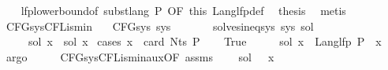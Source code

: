 \begin{isabellebody}
\ \ \isamarkupfalse%
\ lfp{\isacharunderscore}{\kern0pt}lowerbound{\isacharbrackleft}{\kern0pt}of\ {\isachardoublequoteopen}subst{\isacharunderscore}{\kern0pt}lang\ P{\isachardoublequoteclose}{\isacharcomma}{\kern0pt}\ OF\ this{\isacharbrackright}{\kern0pt}\ Lang{\isacharunderscore}{\kern0pt}lfp{\isacharunderscore}{\kern0pt}def\ \isamarkupfalse%
\ {\isacharquery}{\kern0pt}thesis\ \isamarkupfalse%
\ metis\isanewline
{}\isamarkupfalse%
%
\endisatagproof
{\isafoldproof}%
%
\isadelimproof
\isanewline
%
\endisadelimproof
\isanewline
{}\isamarkupfalse%
\ CFG{\isacharunderscore}{\kern0pt}sys{\isacharunderscore}{\kern0pt}CFL{\isacharunderscore}{\kern0pt}is{\isacharunderscore}{\kern0pt}min{\isacharcolon}{\kern0pt}\isanewline
\ \ \ {\isachardoublequoteopen}CFG{\isacharunderscore}{\kern0pt}sys\ sys{\isachardoublequoteclose}\isanewline
\ \ \ \ \ \ \ {\isachardoublequoteopen}solves{\isacharunderscore}{\kern0pt}ineq{\isacharunderscore}{\kern0pt}sys\ sys\ sol{\isacharprime}{\kern0pt}{\isachardoublequoteclose}\isanewline
\ \ \ \ \ {\isachardoublequoteopen}sol\ x\ {\isasymsubseteq}\ sol{\isacharprime}{\kern0pt}\ x{\isachardoublequoteclose}\isanewline
%
\isadelimproof
%
\endisadelimproof
%
\isatagproof
{}\isamarkupfalse%
\ {\isacharparenleft}{\kern0pt}cases\ {\isachardoublequoteopen}x\ {\isacharless}{\kern0pt}\ card\ {\isacharparenleft}{\kern0pt}Nts\ P{\isacharparenright}{\kern0pt}{\isachardoublequoteclose}{\isacharparenright}{\kern0pt}\isanewline
\ \ \isamarkupfalse%
\ True\isanewline
\ \ \isamarkupfalse%
\ \isamarkupfalse%
\ {\isachardoublequoteopen}sol\ x\ {\isacharequal}{\kern0pt}\ Lang{\isacharunderscore}{\kern0pt}lfp\ P\ {\isacharparenleft}{\kern0pt}{\isasymgamma}\ x{\isacharparenright}{\kern0pt}{\isachardoublequoteclose}\ \isamarkupfalse%
\ argo\isanewline
\ \ \isamarkupfalse%
\ \isamarkupfalse%
\ CFG{\isacharunderscore}{\kern0pt}sys{\isacharunderscore}{\kern0pt}CFL{\isacharunderscore}{\kern0pt}is{\isacharunderscore}{\kern0pt}min{\isacharunderscore}{\kern0pt}aux{\isacharbrackleft}{\kern0pt}OF\ assms{\isacharbrackright}{\kern0pt}\ \isamarkupfalse%
\ {\isachardoublequoteopen}{\isasymdots}\ {\isasymsubseteq}\ sol{\isacharprime}{\kern0pt}\ {\isacharparenleft}{\kern0pt}{\isasymgamma}{\isacharprime}{\kern0pt}\ {\isacharparenleft}{\kern0pt}{\isasymgamma}\ x{\isacharparenright}{\kern0pt}{\isacharparenright}{\kern0pt}{\isachardoublequoteclose}\ \isamarkupfalse%

\end{isabellebody}
